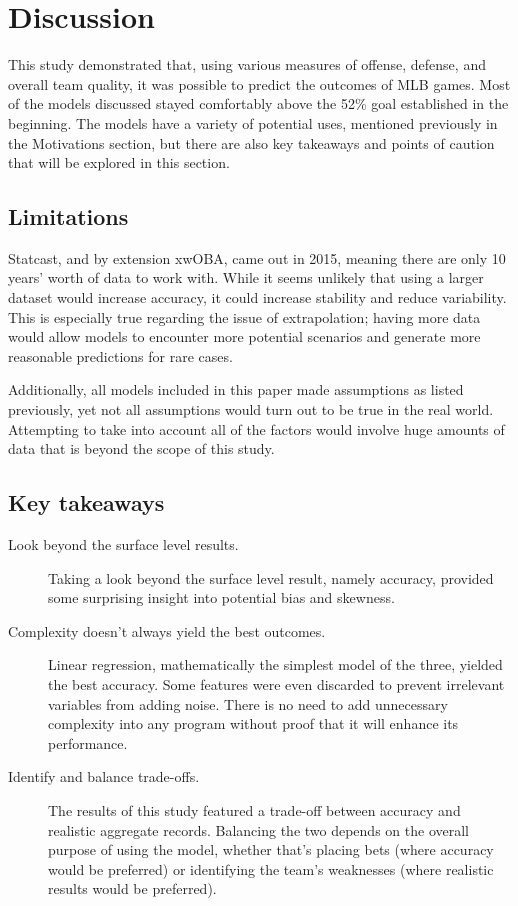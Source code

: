 \documentclass{paper}
\begin{document}
\section{Discussion}
This study demonstrated that, using various measures of offense, defense, and overall team quality, it was possible to predict the outcomes of MLB games. Most of the models discussed stayed comfortably above the 52\% goal established in the beginning. The models have a variety of potential uses, mentioned previously in the Motivations section, but there are also key takeaways and points of caution that will be explored in this section.

\subsection{Limitations}
Statcast, and by extension xwOBA, came out in 2015, meaning there are only 10 years' worth of data to work with. While it seems unlikely that using a larger dataset would increase accuracy, it could increase stability and reduce variability. This is especially true regarding the issue of extrapolation; having more data would allow models to encounter more potential scenarios and generate more reasonable predictions for rare cases.

Additionally, all models included in this paper made assumptions as listed previously, yet not all assumptions would turn out to be true in the real world. Attempting to take into account all of the factors would involve huge amounts of data that is beyond the scope of this study.

\subsection{Key takeaways}
\begin{description}
\item[Look beyond the surface level results.] Taking a look beyond the surface level result, namely accuracy, provided some surprising insight into potential bias and skewness.
\item[Complexity doesn't always yield the best outcomes.] Linear regression, mathematically the simplest model of the three, yielded the best accuracy. Some features were even discarded to prevent irrelevant variables from adding noise. There is no need to add unnecessary complexity into any program without proof that it will enhance its performance.
\item[Identify and balance trade-offs.] The results of this study featured a trade-off between accuracy and realistic aggregate records. Balancing the two depends on the overall purpose of using the model, whether that's placing bets (where accuracy would be preferred) or identifying the team's weaknesses (where realistic results would be preferred).
\end{description}
\end{document}
